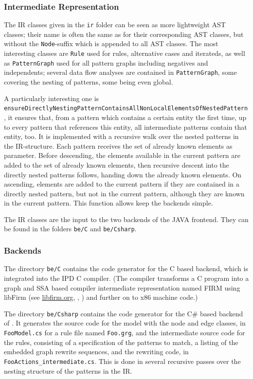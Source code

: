 \subsubsection*{Intermediate Representation}
The IR classes given in the \texttt{ir} folder can be seen as more lightweight AST classes; their name is often the same as for their corresponding AST classes, but without the \texttt{Node}-suffix which is appended to all AST classes.
The most interesting classes are \texttt{Rule} used for rules, alternative cases and iterateds, as well as \texttt{PatternGraph} used for all pattern graphs including negatives and independents;
several data flow analyses are contained in \texttt{PatternGraph}, some covering the nesting of patterns, some being even global.

A particularly interesting one is \texttt{ensure\-Directly\-Nesting\-Pattern\-Contains\-All\-Non\-Local\-Elements\-Of\-Nested\-Pattern}, it ensures that, from a pattern which contains a certain entity the first time, up to every pattern that references this entity, all intermediate patterns contain that entity, too.
It is implemented with a recursive walk over the nested patterns in the IR-structure. 
Each pattern receives the set of already known elements as parameter.
Before descending, the elements available in the current pattern are added to the set of already known elements,
then recursive descent into the directly nested patterns follows, handing down the already known elements.
On ascending, elements are added to the current pattern if they are contained in a directly nested pattern, but not in the current pattern, although they are known in the current pattern.
This function allows keep the backends simple.

The IR classes are the input to the two backends of the JAVA frontend.
They can be found in the folders \texttt{be/C} and \texttt{be/Csharp}.


\subsubsection*{Backends}

The directory \texttt{be/C} contains the code generator for the C based backend, which is integrated into the IPD C compiler.
(The compiler transforms a C program into a graph and SSA based compiler intermediate representation named FIRM using libFirm (see \url{libfirm.org}, \cite{TBL:99}, \cite{Lin:02}) and further on to x86 machine code.)

The directory \texttt{be/Csharp} contains the code generator for the C\# based backend of \GrG. 
It generates the source code for the model with the node and edge classes, in \texttt{FooModel.cs} for a rule file named \texttt{Foo.grg},
and the intermediate source code for the rules, consisting of a specification of the patterns to match, a listing of the embedded graph rewrite sequences, and the rewriting code, in \texttt{Foo\-Actions\_intermediate.cs}.
This is done in several recursive passes over the nesting structure of the patterns in the IR. 

